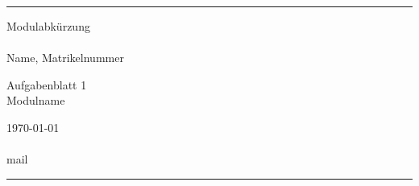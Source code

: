 \documentclass[a4paper]{article} %
\begin{document}

\title{} %
\fancyhead[C]{}
\hrule \medskip %
\begin{minipage}{0.295\textwidth} %
    \raggedright
    Modulabkürzung\\ %
    \footnotesize %
    \hfill\\
    Name, Matrikelnummer %
\end{minipage}
\begin{minipage}{0.4\textwidth} %
    \centering
    \large %
    Aufgabenblatt 1\\ %
    \normalsize %
    Modulname\\ %
\end{minipage}
\begin{minipage}{0.295\textwidth} %
    \raggedleft
    \today\\ %
    \footnotesize %
    \hfill\\
    mail %
\end{minipage}
\medskip\hrule %
\bigskip



\bigskip



\end{document}
